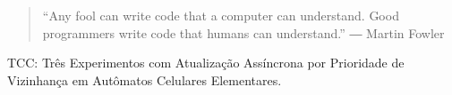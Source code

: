 
\begin{quote}
``Any fool can write code that a \newline computer can understand. Good \newline programmers write code that humans can understand.''
― Martin Fowler 
\end{quote}

%
%
%
%
%



\divider\smallskip


\smallskip


\divider

\divider


\smallskip

\divider

\divider

\divider


\medskip


TCC: Três Experimentos com Atualização Assíncrona por Prioridade de Vizinhança em Autômatos Celulares Elementares.


\divider

